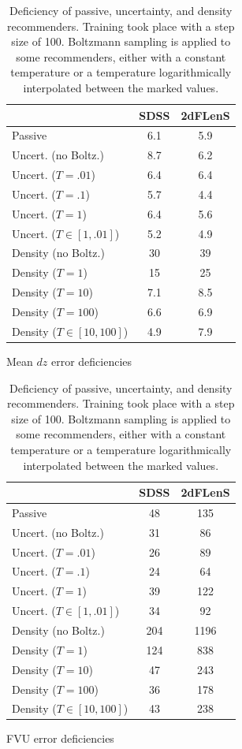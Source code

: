 \documentclass[11pt,twoside,openright]{report}
\begin{document}
\begin{table}
\centering
\begin{subtable}{.5\textwidth}
\centering

\begin{tabular}{l | c c}
    & SDSS & 2dFLenS \\
    \hline
    Passive & 6.1 & 5.9 \\
    Uncert. (no Boltz.) & 8.7 & 6.2 \\
    Uncert. ($T = .01$) & 6.4 & 6.4 \\
    Uncert. ($T = .1$) & 5.7 & 4.4 \\
    Uncert. ($T = 1$) & 6.4 & 5.6 \\
    Uncert. ($T \in [1,.01]$) & 5.2 & 4.9 \\
    Density (no Boltz.) & 30 & 39 \\
    Density ($T = 1$) & 15 & 25 \\
    Density ($T = 10$) & 7.1 & 8.5 \\
    Density ($T = 100$) & 6.6 & 6.9 \\
    Density ($T \in [10,100]$) & 4.9 & 7.9 \\
\end{tabular}

\caption{Mean $dz$ error deficiencies}
\end{subtable}%
\begin{subtable}{.5\textwidth}
\centering

\begin{tabular}{l | c c}
    & SDSS & 2dFLenS \\
    \hline
    Passive & 48 & 135 \\
    Uncert. (no Boltz.) & 31 & 86 \\
    Uncert. ($T = .01$) & 26 & 89 \\
    Uncert. ($T = .1$) & 24 & 64 \\
    Uncert. ($T = 1$) & 39 & 122 \\
    Uncert. ($T \in [1,.01]$) & 34 & 92 \\
    Density (no Boltz.) & 204 & 1196 \\
    Density ($T = 1$) & 124 & 838 \\
    Density ($T = 10$) & 47 & 243 \\
    Density ($T = 100$) & 36 & 178 \\
    Density ($T \in [10,100]$) & 43 & 238 \\
\end{tabular}

\caption{FVU error deficiencies}
\end{subtable}

\caption{Deficiency of passive, uncertainty, and density recommenders. Training took place with a step size of 100. Boltzmann sampling is applied to some recommenders, either with a constant temperature or a temperature logarithmically interpolated between the marked values.}
\label{table:boltzmann_deficiencies}
\end{table}
\end{document}

